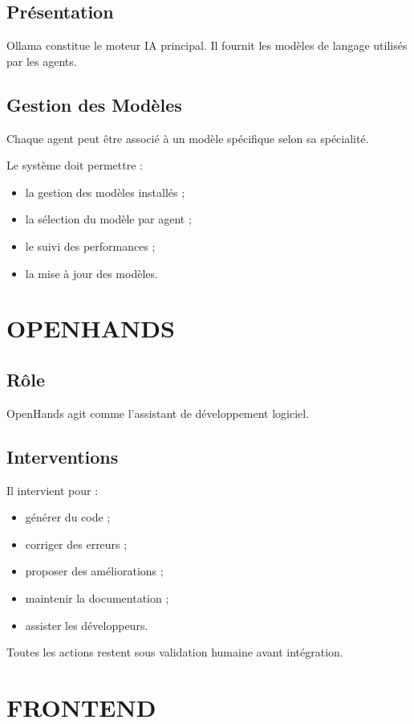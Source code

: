 \documentclass[12pt,a4paper,oneside]{book}
\begin{document}
\section{Présentation}
Ollama constitue le moteur IA principal. Il fournit les modèles de langage utilisés par les agents.

\section{Gestion des Modèles}
Chaque agent peut être associé à un modèle spécifique selon sa spécialité.

Le système doit permettre :
\begin{itemize}
\item la gestion des modèles installés ;
\item la sélection du modèle par agent ;
\item le suivi des performances ;
\item la mise à jour des modèles.
\end{itemize}

\chapter{OPENHANDS}

\section{Rôle}
OpenHands agit comme l'assistant de développement logiciel.

\section{Interventions}
Il intervient pour :
\begin{itemize}
\item générer du code ;
\item corriger des erreurs ;
\item proposer des améliorations ;
\item maintenir la documentation ;
\item assister les développeurs.
\end{itemize}

Toutes les actions restent sous validation humaine avant intégration.

\chapter{FRONTEND}
\end{document}
